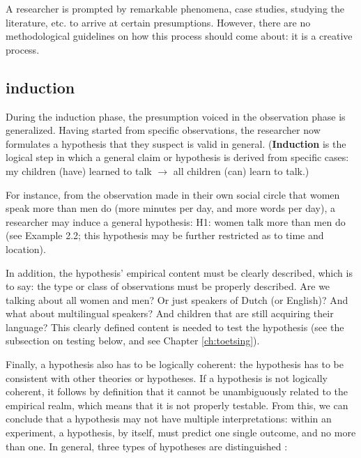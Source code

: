 \documentclass[
]{book}
\begin{document}
A researcher is prompted by remarkable phenomena, case studies, studying the literature, etc. to arrive at certain presumptions. However, there are no methodological guidelines on how this process should come about: it is a creative process.

\hypertarget{induction}{%
\subsection{induction}\label{induction}}

During the induction phase, the presumption voiced in the observation phase is generalized. Having started from specific observations, the researcher now formulates a hypothesis that they suspect is valid in general. (\textbf{Induction} is the logical step in which a general claim or hypothesis is derived from specific cases: my children (have) learned to talk \(\rightarrow\) all children (can) learn to talk.)

For instance, from the observation made in their own social circle that women speak more than men do (more minutes per day, and more words per day), a researcher may induce a general hypothesis: H1: women talk more than men do (see Example 2.2; this hypothesis may be further restricted as to time and location).

In addition, the hypothesis' empirical content must be clearly described, which is to say: the type or class of observations must be properly described. Are we talking about all women and men? Or just speakers of Dutch (or English)? And what about multilingual speakers? And children that are still acquiring their language? This clearly defined content is needed to test the hypothesis (see the subsection on testing below, and see Chapter \ref{ch:toetsing}).

Finally, a hypothesis also has to be logically coherent: the hypothesis has to be consistent with other theories or hypotheses. If a hypothesis is not logically coherent, it follows by definition that it cannot be unambiguously related to the empirical realm, which means that it is not properly testable. From this, we can conclude that a hypothesis may not have multiple interpretations: within an experiment, a hypothesis, by itself, must predict one single outcome, and no more than one.
In general, three types of hypotheses are distinguished \citep{Groot61}:
\end{document}
